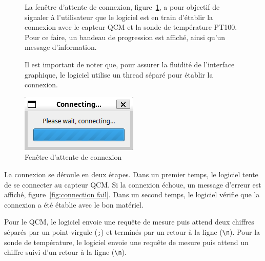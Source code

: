 \begin{figure}[H]
    \begin{minipage}{0.64\textwidth}
        La fenêtre d'attente de connexion, figure~\ref{fig:connecting window}, a pour objectif de signaler à l'utilisateur que le logiciel est en train d'établir la connexion avec le capteur QCM et la sonde de température PT100.
        Pour ce faire, un bandeau de progression est affiché, ainsi qu'un message d'information.

        Il est important de noter que, pour assurer la fluidité de l'interface graphique, le logiciel utilise un thread séparé pour établir la connexion.
    \end{minipage}\hfill
    \begin{minipage}{0.30\textwidth}
        \centering
        \includegraphics[width=\textwidth]{assets/figures/Connecting.png}
        \caption{Fenêtre d'attente de connexion}
        \label{fig:connecting window}
    \end{minipage}
\end{figure}

La connexion se déroule en deux étapes.
Dans un premier temps, le logiciel tente de se connecter au capteur QCM. Si la connexion échoue, un message d'erreur est affiché, figure~\ref{fig:connection fail}.
Dans un second temps, le logiciel vérifie que la connexion a été établie avec le bon matériel.

Pour le QCM, le logiciel envoie une requête de mesure puis attend deux chiffres séparés par un point-virgule (\texttt{;}) et terminés par un retour à la ligne (\texttt{\textbackslash n}).
Pour la sonde de température, le logiciel envoie une requête de mesure puis attend un chiffre suivi d'un retour à la ligne (\texttt{\textbackslash n}).

